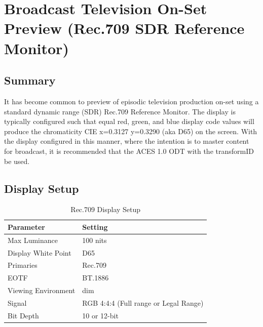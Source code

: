 \clearpage
\section{Broadcast Television On-Set Preview (Rec.709 SDR Reference Monitor)}
\label{sec:ot-app-rec709onset}

\subsection{Summary}
\label{subsec:summary-rec709onset}

It has become common to preview of episodic television production on-set using a standard dynamic range (SDR) Rec.709  Reference Monitor. The display is typically configured such that equal red, green, and blue display code values will produce the chromaticity CIE x=0.3127 y=0.3290 (aka D65) on the screen. With the display configured in this manner, where the intention is to master content for broadcast, it is recommended that the ACES 1.0 ODT with the transformID \texttt{} be used.

\subsection{Display Setup}
\label{subsec:setup-rec709onset}

\begin{table}[ht!]
    \centering
        \begin{tabular}{|p{1.25in}|p{3in}|}
            \hline
            \textbf{Parameter} & \textbf{Setting} \\ \hline
            Max Luminance & 100 nits \\ \hline
            Display White Point & D65 \\ \hline
            Primaries & Rec.709  \\ \hline
            EOTF & BT.1886 \\ \hline
            Viewing Environment & dim \\ \hline
            Signal & RGB 4:4:4 (Full range or Legal Range) \\ \hline
            Bit Depth & 10 or 12-bit \\ \hline 
    \end{tabular}
    \caption[Broadcast Television On-Set Preview - Display Setup]{\small Rec.709 Display Setup} 
    \label{tab:setup-rec709onset}
\end{table}

